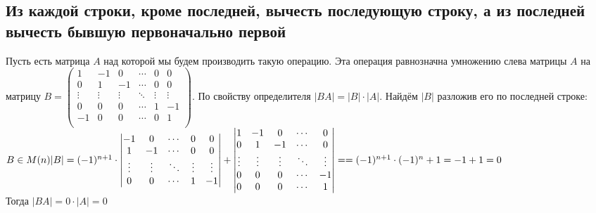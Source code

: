 \subsection{Из каждой строки, кроме последней, вычесть последующую строку, а из последней вычесть бывшую первоначально первой}
Пусть есть матрица $ A $ над которой мы будем производить такую операцию.
Эта операция равнозначна умножению слева матрицы $ A $ на матрицу
$
	B =
	\begin{pmatrix}
		1      & -1     & 0      & \cdots & 0      & 0      \\
		0      & 1      & -1     & \cdots & 0      & 0      \\
		\vdots & \vdots & \vdots & \ddots & \vdots & \vdots \\
		0      & 0      & 0      & \cdots & 1      & -1     \\
		-1     & 0      & 0      & \cdots & 0      & 1      \\
	\end{pmatrix}
$. По свойству определителя $ |BA| = |B| \cdot |A| $. Найдём $ |B| $ разложив его по последней строке:
\\[1em]
$
	B \in M(n)
	\\[1em]
	|B| = (-1)^{n+1} \cdot
	\begin{vmatrix}
		-1     & 0      & \cdots & 0      & 0      \\
		1      & -1     & \cdots & 0      & 0      \\
		\vdots & \vdots & \ddots & \vdots & \vdots \\
		0      & 0      & \cdots & 1      & -1     \\
	\end{vmatrix}
	+
	\begin{vmatrix}
		1      & -1     & 0      & \cdots & 0      \\
		0      & 1      & -1     & \cdots & 0      \\
		\vdots & \vdots & \vdots & \ddots & \vdots \\
		0      & 0      & 0      & \cdots & -1     \\
		0      & 0      & 0      & \cdots & 1      \\
	\end{vmatrix}
	=
	\\[1em]
	=
	(-1)^{n+1} \cdot (-1)^n + 1 = -1 + 1 = 0
$
\\[1em]
Тогда $ |BA| = 0 \cdot |A| = 0 $
